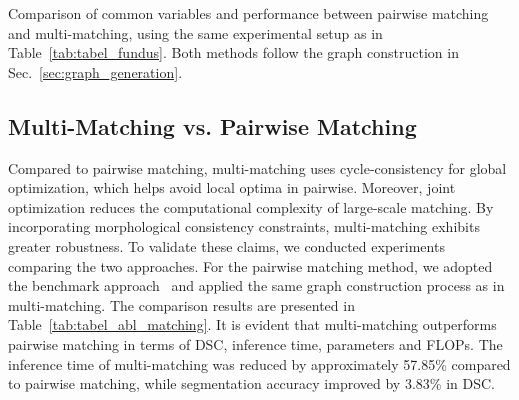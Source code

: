 \begin{table}[htb!]
\vspace{-9pt}
\setlength{\tabcolsep}{8pt}
\centering
  \caption{Comparison of common variables and performance between pairwise matching and multi-matching, using the same experimental setup as in Table~\ref{tab:tabel_fundus}. Both methods follow the graph construction in Sec.~\ref{sec:graph_generation}.}
  \vspace{-0.3cm}
  \begin{adjustbox}{width=0.979\linewidth}
    
  \end{adjustbox}
  \label{tab:tabel_abl_matching}
\end{table}
\vspace{-0.5cm}
\subsection{Multi-Matching vs. Pairwise Matching}
Compared to pairwise matching, multi-matching uses cycle-consistency for global optimization, which helps avoid local optima in pairwise. Moreover, joint optimization reduces the computational complexity of large-scale matching. By incorporating morphological consistency constraints, multi-matching exhibits greater robustness. To validate these claims, we conducted experiments comparing the two approaches. 
For the pairwise matching method, we adopted the benchmark approach~\cite{wang2019learning} and applied the same graph construction process as in multi-matching. The comparison results are presented in Table~\ref{tab:tabel_abl_matching}. It is evident that multi-matching outperforms pairwise matching in terms of DSC, inference time, parameters and FLOPs.
The inference time of multi-matching was reduced by approximately 57.85\% compared to pairwise matching, while segmentation accuracy improved by 3.83\% in DSC.